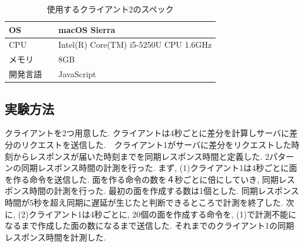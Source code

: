 \begin{table}[]
\begin{center}
	\caption{使用するクライアント2のスペック}
	\begin{tabular}{|l|l|} \hline
		OS & macOS Sierra \\ \hline
		CPU & Intel(R) Core(TM) i5-5250U CPU 1.6GHz \\ \hline
		メモリ & 8GB \\ \hline
    開発言語　& JavaScript \\ \hline
	\end{tabular}
	\label{client2}
\end{center}
\end{table}

\subsection{実験方法}
クライアントを2つ用意した. クライアントは4秒ごとに差分を計算しサーバに差分のリクエストを送信した.　クライアント1がサーバに差分をリクエストした時刻からレスポンスが届いた時刻までを同期レスポンス時間と定義した. 2パターンの同期レスポンス時間の計測を行った.
まず, (1)クライアント1は4秒ごとに面を作る命令を送信した. 面を作る命令の数を４秒ごとに倍にしていき, 同期レスポンス時間の計測を行った. 最初の面を作成する数は1個とした. 同期レスポンス時間が5秒を超え同期に遅延が生じたと判断できるところで計測を終了した.
次に, (2)クライアント1は4秒ごとに, 20個の面を作成する命令を, (1)で計測不能になるまで作成した面の数になるまで送信した. それまでのクライアント1の同期レスポンス時間を計測した.
